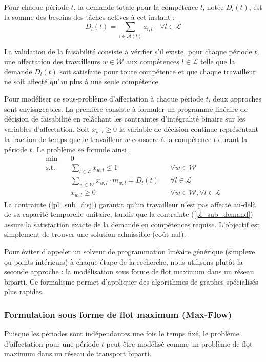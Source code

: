 Pour chaque période $t$, la demande totale pour la compétence $l$, notée $D_l(t)$, est la somme des besoins des tâches actives à cet instant :
\begin{equation}
    D_l(t) = \sum_{i \in \mathcal{A}(t)} a_{i,l} \quad \forall l \in \mathcal{L}
\end{equation}

La validation de la faisabilité consiste à vérifier s'il existe, pour chaque période $t$, une affectation des travailleurs $w \in \mathcal{W}$ aux compétences $l \in \mathcal{L}$ telle que la demande $D_l(t)$ soit satisfaite pour toute compétence et que chaque travailleur ne soit affecté qu'au plus à une seule compétence.

Pour modéliser ce sous-problème d'affectation à chaque période $t$, deux approches sont envisageables. La première consiste à formuler un programme linéaire de décision de faisabilité en relâchant les contraintes d'intégralité binaire sur les variables d'affectation. Soit $x_{w,l} \ge 0$ la variable de décision continue représentant la fraction de temps que le travailleur $w$ consacre à la compétence $l$ durant la période $t$. Le problème se formule ainsi :
\begin{align}
    \min \quad & 0 \label{pl_sub_obj} \\
    \text{s.t.} \quad & \sum_{l \in \mathcal{L}} x_{w,l} \leq 1 && \forall w \in \mathcal{W} \label{pl_sub_disj} \\
    & \sum_{w \in \mathcal{W}} x_{w,l} \cdot m_{w,l} = D_l(t) && \forall l \in \mathcal{L} \label{pl_sub_demand} \\
    & x_{w,l} \geq 0 && \forall w \in \mathcal{W}, \forall l \in \mathcal{L}
\end{align}
La contrainte (\ref{pl_sub_disj}) garantit qu'un travailleur n'est pas affecté au-delà de sa capacité temporelle unitaire, tandis que la contrainte (\ref{pl_sub_demand}) assure la satisfaction exacte de la demande en compétences requise. L'objectif est simplement de trouver une solution admissible (coût nul).

\bigskip

Pour éviter d'appeler un solveur de programmation linéaire générique (simplexe ou points intérieurs) à chaque étape de la recherche, nous utilisons plutôt la seconde approche : la modélisation sous forme de flot maximum dans un réseau biparti. Ce formalisme permet d'appliquer des algorithmes de graphes spécialisés plus rapides.

\subsubsection{Formulation sous forme de flot maximum (Max-Flow)}
Puisque les périodes sont indépendantes une fois le temps fixé, le problème d'affectation pour une période $t$ peut être modélisé comme un problème de flot maximum dans un réseau de transport biparti.

